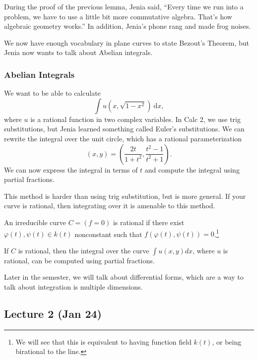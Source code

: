 \documentclass[twoside, 10pt]{article}
\begin{document}
    During the proof of the previous lemma, Jenia said, ``Every time we run into a problem, we have to use a little bit more commutative algebra. That's how algebraic geometry works.'' In addition, Jenia's phone rang and made frog noises.

    We now have enough vocabulary in plane curves to state Bezout's Theorem, but Jenia now wants to talk about Abelian integrals.

    \subsubsection{Abelian Integrals}

    We want to be able to calculate \[\int u(x,\sqrt{1-x^2})\ \mathrm{d}x,\] where $u$ is a rational function in two complex variables. In Calc 2, we use trig substitutions, but Jenia learned something called Euler's substitutions. We can rewrite the integral over the unit circle, which has a rational parameterization \[(x,y) = \left( \frac{2t}{1+t^2}, \frac{t^2-1}{t^2+1} \right).\] We can now express the integral in terms of $t$ and compute the integral using partial fractions.

    This method is harder than using trig substitution, but is more general. If your curve is rational, then integrating over it is amenable to this method.

    \begin{defn}
        An irreducible curve $C = (f=0)$ is rational if there exist $\varphi(t), \psi(t) \in k(t)$ nonconstant such that $f(\varphi(t),\psi(t)) = 0$.\footnote{We will see that this is equivalent to having function field $k(t)$, or being birational to the line.}
    \end{defn}

    \begin{cor}
        If $C$ is rational, then the integral over the curve $\int u(x,y) dx$, where $u$ is rational, can be computed using partial fractions.
    \end{cor}

    \begin{rmk}
        Later in the semester, we will talk about differential forms, which are a way to talk about integration is multiple dimensions.
    \end{rmk}

    \subsection{Lecture 2 (Jan 24)}%
\end{document}

